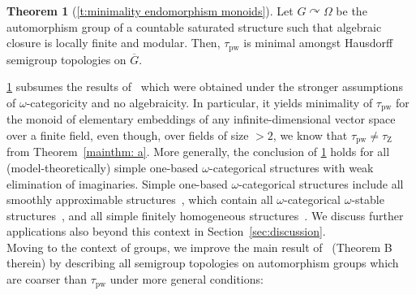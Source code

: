 \documentclass{article}
\theoremstyle{remark}
\theoremstyle{definition}
\newtheorem{thmx}{Theorem}
\def\acts{\curvearrowright}
\def\G{\overline{G}}
\newcommand{\pw}[0]{\tau_{\mathrm{pw}}}
\newcommand{\zar}[0]{\tau_{\mathrm{Z}}}
\begin{document}
\begin{thmx}[\cref{t:minimality endomorphism monoids}]\label{mainthm: b}Let $G\acts\Omega$ be the automorphism group of a countable saturated structure such that {algebraic closure is  locally finite  and modular.}
Then, $\pw$ is minimal amongst Hausdorff semigroup topologies on $\G$.  
\end{thmx}
{\cref{mainthm: b} subsumes the results of~\cite{pinskerschindler} which were obtained under the stronger assumptions of $\omega$-categoricity and  no algebraicity. In particular, it yields minimality of $\pw$ for the {monoid of elementary embeddings}
of any infinite-dimensional vector space over a finite field, {even though, over fields of size $>2$, we know that $\pw\neq\zar$ from  Theorem~\ref{mainthm: a}.}
{More generally,} the conclusion of \cref{mainthm: b} holds for all (model-theoretically) simple one-based {$\omega$-categorical} structures %
with  %
weak elimination of imaginaries.
Simple one-based {$\omega$-categorical} structures 
include
all smoothly approximable structures~\cite{cherlin2003finite}, which contain all $\omega$-categorical $\omega$-stable structures~\cite{cherlin1985}, and all simple finitely homogeneous structures~\cite{baldwin2024simplehomogeneousstructuresindiscernible}. We discuss further applications %
also beyond this context in Section~\ref{sec:discussion}.} \\ %


{Moving %
to the context of groups, we improve the main result of~\cite{ghaddln24} (Theorem B therein) by describing {all} %
semigroup topologies on automorphism groups %
which are coarser than $\pw$ under more general conditions:} 
\end{document}
